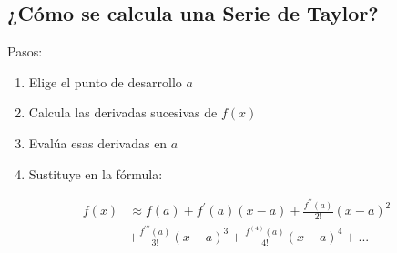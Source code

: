\documentclass[12pt, a4paper, oneside]{article}
\begin{document}
\subsection{¿Cómo se calcula una Serie de Taylor?}
Pasos:
\begin{enumerate}
	\item Elige el punto de desarrollo $a$
	\item Calcula las derivadas sucesivas de $f(x)$
	\item Evalúa esas derivadas en $a$
	\item Sustituye en la fórmula:
\end{enumerate}
\begingroup
\Large
\begin{align*}
	f(x) & \approx f(a) + f^\prime(a)(x-a) + \frac{f^{\prime\prime}(a)}{2!}(x-a)^2            \\
	     & + \frac{f^{\prime\prime\prime}(a)}{3!}(x-a)^3 + \frac{f^{(4)}(a)}{4!}(x-a)^4 + ... \\
\end{align*}
\endgroup
\end{document}
